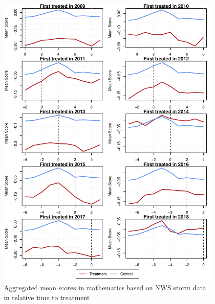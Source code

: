 \begin{figure}[!h]
	\centering
	\includegraphics[scale=1]{"../Code & Data/ParTrendsPlotMathematicsStorm.pdf"}
	\caption{Aggregated mean scores in mathematics based on NWS storm data in relative time to treatment}
	\label{PreTrendsMath}
\end{figure}

